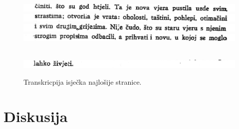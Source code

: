 \documentclass[zavrsnirad]{fer}
\begin{document}
\begin{figure}[H]
\begin{minipage}{0.85\linewidth}
		\vspace{0.5em}
		\includegraphics[width=\linewidth]{Figures/korizmena9/6.png}
	\end{minipage}
	\begin{minipage}{0.85\linewidth}
		\texttt{}
		\vspace{0.5em}
		\includegraphics[width=\linewidth]{Figures/korizmena9/7.png}
	\end{minipage}
	\begin{minipage}{0.85\linewidth}
		\texttt{}
		\vspace{0.5em}
		\includegraphics[width=\linewidth]{Figures/korizmena9/8.png}
	\end{minipage}
	\begin{minipage}{0.85\linewidth}
		\texttt{}
		\vspace{0.5em}
		\includegraphics[width=\linewidth]{Figures/korizmena9/9.png}
	\end{minipage}
	\begin{minipage}{0.85\linewidth}
		\texttt{}
		\vspace{0.5em}\\
		\includegraphics[width=\linewidth]{Figures/korizmena9/10.png}
	\end{minipage}
	\caption{Transkricpija isječka najlošije stranice.}
	\label{fig:compare}
\end{figure}

\chapter{Diskusija}
\label{pog:diskusija}
\end{document}
